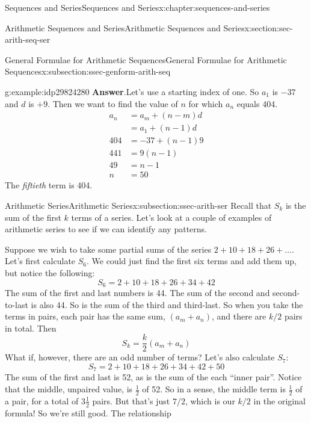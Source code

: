 \documentclass[twoside,10pt,]{book}
\newcommand{\blocktitlefont}{\relax}
\numberwithin{equation}{section}
\newcommand{\amp}{&}
\begin{document}
\begin{chapterptx}{Sequences and Series}{}{Sequences and Series}{}{}{x:chapter:sequences-and-series}
\begin{sectionptx}{Arithmetic Sequences and Series}{}{Arithmetic Sequences and Series}{}{}{x:section:sec-arith-seq-ser}
\begin{subsectionptx}{General Formulae for Arithmetic Sequences}{}{General Formulae for Arithmetic Sequences}{}{}{x:subsection:ssec-genform-arith-seq}
\begin{example}{}{g:example:idp29824280}
\noindent\textbf{\blocktitlefont Answer}.\label{g:answer:idp29819032}{}\hypertarget{g:answer:idp29819032}{}\quad{}Let's use a starting index of one.  So \(a_1\) is \(-37\) and \(d\) is \(+9\).  Then we want to find the value of \(n\) for which \(a_n\) equals 404.%
\begin{align*}
a_n \amp = a_m + \left( n - m \right)d\\
\amp = a_1 + \left(n - 1 \right)d\\
404 \amp =  - 37 + \left( n - 1 \right)9\\
441 \amp = 9\left( n - 1 \right)\\
49 \amp = n - 1\\
n \amp = 50
\end{align*}
The \emph{fiftieth} term is 404.\end{example}
%
\end{subsectionptx}
%
%
\typeout{************************************************}
\typeout{************************************************}
%
\begin{subsectionptx}{Arithmetic Series}{}{Arithmetic Series}{}{}{x:subsection:ssec-arith-ser}
Recall that \(S_k\) is the sum of the first \(k\) terms of a series.  Let's look at a couple of examples of arithmetic series to see if we can identify any patterns.%
\par
Suppose we wish to take some partial sums of the series \(2 + 10 + 18 + 26 + \ldots\).  Let's first calculate \(S_6\).  We could just find the first six terms and add them up, but notice the following:%
\begin{equation*}
S_6 = 2 + 10 + 18 + 26 + 34 + 42
\end{equation*}
The sum of the first and last numbers is 44.  The sum of the second and second-to-last is also 44.  So is the sum of the third and third-last.  So when you take the terms in pairs, each pair has the same sum, \((a_m + a_n)\), and there are \(k/2\) pairs in total.  Then%
\begin{equation*}
S_k = \frac{k}{2}\left( a_m + a_n \right)
\end{equation*}
What if, however, there are an odd number of terms?  Let's also calculate \(S_7\):%
\begin{equation*}
S_7 = 2 + 10 + 18 + 26 + 34 + 42 + 50
\end{equation*}
The sum of the first and last is 52, as is the sum of the each ``inner pair''.  Notice that the middle, unpaired value, is \(\frac{1}{2}\) of 52.  So in a sense, the middle term is \(\frac{1}{2}\)  of a pair, for a total of \(3\frac{1}{2}\)  pairs.  But that's just \(7/2\), which is our \(k/2\) in the original formula!  So we're still good.  The relationship%

\end{subsectionptx}
\end{sectionptx}
\end{chapterptx}
\end{document}
